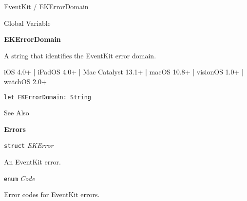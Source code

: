 \documentclass{article}
\title{}
\author{}
\date{}
\begin{document}
EventKit / EKErrorDomain

Global Variable

\textbf{EKErrorDomain}

A string that identifies the EventKit error domain.

iOS 4.0+ | iPadOS 4.0+ | Mac Catalyst 13.1+ | macOS 10.8+ | visionOS 1.0+ | watchOS 2.0+

\texttt{let EKErrorDomain: String}

See Also

\textbf{Errors}

\texttt{struct} \textit{EKError}

An EventKit error.

\texttt{enum} \textit{Code}

Error codes for EventKit errors.

\newpage
\end{document}
